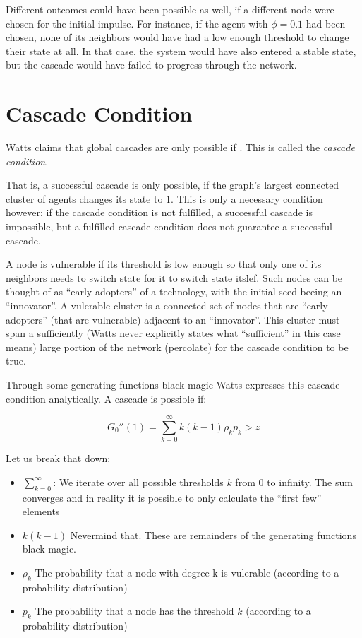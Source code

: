 \documentclass{sig-alternate-05-2015}
\begin{document}
Different outcomes could have been possible as well, if a different node were chosen for the initial impulse. For instance, if the agent with $\phi = 0.1$ had been chosen, none of its neighbors would have had a low enough threshold to change their state at all. In that case, the system would have also entered a stable state, but the cascade would have failed to progress through the network.


\section{Cascade Condition}\label{sec:section}

Watts claims that global cascades are only possible if . This is called the \emph{cascade condition}.

That is, a successful cascade is only possible, if the graph's largest connected cluster of agents changes its state to $1$. This is only a necessary condition however: if the cascade condition is not fulfilled, a successful cascade is impossible, but a fulfilled cascade condition does not guarantee a successful cascade.

A node is vulnerable if its threshold is low enough so that only one of its neighbors needs to switch state for it to switch state itslef. Such nodes can be thought of as ``early adopters'' of a technology, with the initial seed beeing an ``innovator''. A vulerable cluster is a connected set of nodes that are ``early adopters'' (that are vulnerable) adjacent to an ``innovator''. This cluster must span a sufficiently (Watts never explicitly states what ``sufficient'' in this case means) large portion of the network (percolate) for the cascade condition to be true.

Through some generating functions black magic Watts expresses this cascade condition analytically. A cascade is possible if:

\begin{equation}
  G_0''(1) = \sum_{k=0}^\infty k (k-1) \rho_k p_k > z
\end{equation}

Let us break that down:

\begin{itemize}
  \item $\sum_{k=0}^\infty$: We iterate over all possible thresholds $k$ from $0$ to infinity. The sum converges and in reality it is possible to only calculate the ``first few'' elements
  \item $k (k-1)$ Nevermind that. These are remainders of the generating functions black magic.
  \item $\rho_k$ The probability that a node with degree k is vulerable (according to a probability distribution)
  \item $p_k$ The probability that a node has the threshold $k$ (according to a probability distribution)
\end{itemize}
\end{document}
